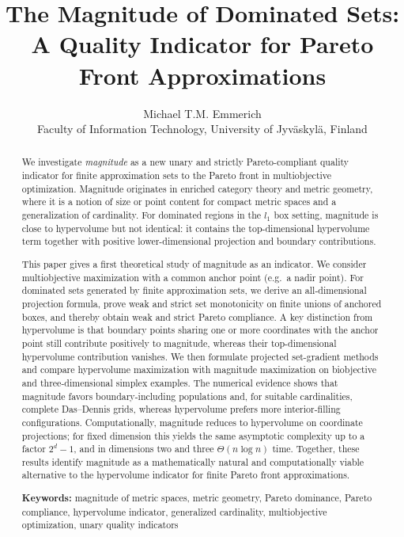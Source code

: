 \documentclass{article}
\title{The Magnitude of Dominated Sets: A Quality Indicator for Pareto Front Approximations}
\author{Michael T.M. Emmerich\\Faculty of Information Technology, University of Jyv\"askyl\"a, Finland}
\date{}
\def\ell{l}%
\theoremstyle{definition}
\newcommand{\1}{\mathbf{1}}
\begin{document}
\maketitle

\begin{abstract}
We investigate \emph{magnitude} as a new unary and strictly Pareto-compliant quality indicator for finite approximation sets to the Pareto front in multiobjective optimization. Magnitude originates in enriched category theory and metric geometry, where it is a notion of size or point content for compact metric spaces and a generalization of cardinality. For dominated regions in the \(\ell_1\) box setting, magnitude is close to hypervolume but not identical: it contains the top-dimensional hypervolume term together with positive lower-dimensional projection and boundary contributions.

This paper gives a first theoretical study of magnitude as an indicator. We consider multiobjective maximization with a common anchor point (e.g.\ a nadir point). For dominated sets generated by finite approximation sets, we derive an all-dimensional projection formula, prove weak and strict set monotonicity on finite unions of anchored boxes, and thereby obtain weak and strict Pareto compliance. A key distinction from hypervolume is that boundary points sharing one or more coordinates with the anchor point still contribute positively to magnitude, whereas their top-dimensional hypervolume contribution vanishes. We then formulate projected set-gradient methods and compare hypervolume maximization with magnitude maximization on biobjective and three-dimensional simplex examples. The numerical evidence shows that magnitude favors boundary-including populations and, for suitable cardinalities, complete Das--Dennis grids, whereas hypervolume prefers more interior-filling configurations. Computationally, magnitude reduces to hypervolume on coordinate projections; for fixed dimension this yields the same asymptotic complexity up to a factor \(2^d-1\), and in dimensions two and three \(\Theta(n\log n)\) time. Together, these results identify magnitude as a mathematically natural and computationally viable alternative to the hypervolume indicator for finite Pareto front approximations.

\textbf{Keywords:} magnitude of metric spaces, metric geometry, Pareto dominance, Pareto compliance, hypervolume indicator, generalized cardinality, multiobjective optimization, unary quality indicators
\end{abstract}
\end{document}
